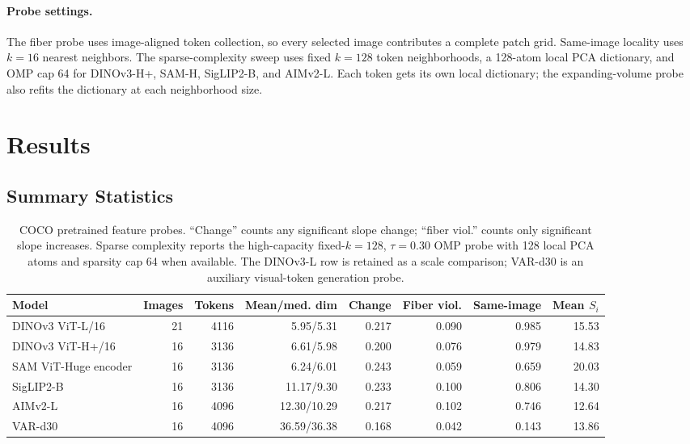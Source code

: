 \documentclass{article}
\newcommand{\dataset}[1]{\textsc{#1}}
\begin{document}
\paragraph{Probe settings.}
The fiber probe uses image-aligned token collection, so every selected image contributes a complete patch grid. Same-image locality uses $k=16$ nearest neighbors. The sparse-complexity sweep uses fixed $k=128$ token neighborhoods, a 128-atom local PCA dictionary, and OMP cap 64 for DINOv3-H+, SAM-H, SigLIP2-B, and AIMv2-L. Each token gets its own local dictionary; the expanding-volume probe also refits the dictionary at each neighborhood size.

\section{Results}
\subsection{Summary Statistics}
\begin{table}[H]
\centering
\scriptsize
\caption{\dataset{COCO} pretrained feature probes. ``Change'' counts any significant slope change; ``fiber viol.'' counts only significant slope increases. Sparse complexity reports the high-capacity fixed-$k=128$, $\tau=0.30$ OMP probe with 128 local PCA atoms and sparsity cap 64 when available. The DINOv3-L row is retained as a scale comparison; VAR-d30 is an auxiliary visual-token generation probe.}
\begin{tabular}{@{}lrrrrrrr@{}}
\toprule
Model & Images & Tokens & Mean/med. dim & Change & Fiber viol. & Same-image & Mean $S_i$ \\
\midrule
DINOv3 ViT-L/16 & 21 & 4116 & 5.95/5.31 & 0.217 & 0.090 & 0.985 & 15.53 \\
DINOv3 ViT-H+/16 & 16 & 3136 & 6.61/5.98 & 0.200 & 0.076 & 0.979 & 14.83 \\
SAM ViT-Huge encoder & 16 & 3136 & 6.24/6.01 & 0.243 & 0.059 & 0.659 & 20.03 \\
SigLIP2-B & 16 & 3136 & 11.17/9.30 & 0.233 & 0.100 & 0.806 & 14.30 \\
AIMv2-L & 16 & 4096 & 12.30/10.29 & 0.217 & 0.102 & 0.746 & 12.64 \\
VAR-d30 & 16 & 4096 & 36.59/36.38 & 0.168 & 0.042 & 0.143 & 13.86 \\
\bottomrule
\end{tabular}
\label{tab:coco-vit-sam}
\end{table}
\end{document}
